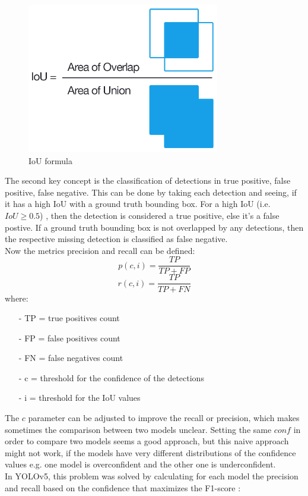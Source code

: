 \begin{figure}[!hb]

  \includegraphics[width=0.75\textwidth]{images/iou}
  \centering
  \caption{IoU formula \cite{map_tutorial}}
  \label{fig:iou}
\end{figure}

The second key concept is the classification of detections in true positive, false positive, false negative. This can be done by taking each detection and seeing, if it has a high IoU with a ground truth bounding box. For a high IoU (i.e. $IoU \geq 0.5$) , then the detection is considered a true positive, else it's a false postive. If a ground truth bounding box is not overlapped by any detections, then the respective missing detection is classified as false negative.\\
Now the metrics precision and recall can be defined:
\begin{equation}
p(c,i) = \frac{TP}{TP + FP}
\end{equation}
\begin{equation}
r(c,i) = \frac{TP}{TP + FN}
\end{equation}
where:
\begin{itemize}
\item[-]{TP = true positives count}
\item[-]{FP = false positives count}
\item[-]{FN = false negatives count}
\item[-]{c = threshold for the confidence of the detections}
\item[-]{i = threshold for the IoU values}
\end{itemize}

The $c$ parameter can be adjusted to improve the recall or precision, which makes sometimes the comparison between two models unclear. Setting the same $conf$ in order to compare two models seems a good approach, but this naive approach might not work, if the models have very different distributions of the confidence values e.g. one model is overconfident and the other one is underconfident. \\
In YOLOv5, this problem was solved by calculating for each model the precision and recall based on the confidence that maximizes the F1-score  \cite{yolov5_conf}:

